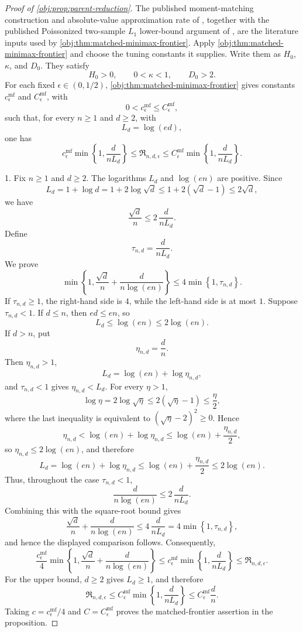 \begin{proof}[Proof of \cref{obj:prop:parent-reduction}]
The published moment-matching construction and absolute-value approximation rate of
\citep[Lemma 1 and Section 3.1]{CaiLow2011L1}, together with the published Poissonized two-sample
\(L_1\) lower-bound argument of \citep[Theorem 3 and equation (24)]{JiaoHanWeissman2018L1},
are the literature inputs used by \cref{obj:thm:matched-minimax-frontier}. Apply
\cref{obj:thm:matched-minimax-frontier} and choose the tuning constants it supplies. Write them as
\(H_0\), \(\kappa\), and \(D_0\). They satisfy
\[
H_0>0,\qquad 0<\kappa<1,\qquad D_0>2 .
\]
For each fixed \(\epsilon\in(0,1/2)\), \cref{obj:thm:matched-minimax-frontier} gives constants
\(c_\epsilon^{\mathrm{mf}}\) and \(C_\epsilon^{\mathrm{mf}}\), with
\[
0<c_\epsilon^{\mathrm{mf}}\le C_\epsilon^{\mathrm{mf}},
\]
such that, for every \(n\ge1\) and \(d\ge2\), with
\[
L_d=\log(ed),
\]
one has
\[
c_\epsilon^{\mathrm{mf}}
\min\left\{1,\frac{d}{nL_d}\right\}
\le
\mathfrak R_{n,d,\epsilon}
\le
C_\epsilon^{\mathrm{mf}}
\min\left\{1,\frac{d}{nL_d}\right\}.
\]

1. Fix \(n\ge1\) and \(d\ge2\). The logarithms \(L_d\) and \(\log(en)\) are positive. Since
\[
L_d
=
1+\log d
=
1+2\log\sqrt d
\le
1+2(\sqrt d-1)
\le
2\sqrt d,
\]
we have
\[
\frac{\sqrt d}{n}
\le
2\,\frac{d}{nL_d}.
\]
Define
\[
\tau_{n,d}=\frac{d}{nL_d}.
\]
We prove
\[
\min\left\{1,\frac{\sqrt d}{n}+\frac{d}{n\log(en)}\right\}
\le
4\min\left\{1,\tau_{n,d}\right\}.
\]
If \(\tau_{n,d}\ge1\), the right-hand side is \(4\), while the left-hand side is at most \(1\).
Suppose \(\tau_{n,d}<1\). If \(d\le n\), then \(ed\le en\), so
\[
L_d\le \log(en)\le 2\log(en).
\]
If \(d>n\), put
\[
\eta_{n,d}=\frac dn .
\]
Then \(\eta_{n,d}>1\),
\[
L_d=\log(en)+\log\eta_{n,d},
\]
and \(\tau_{n,d}<1\) gives \(\eta_{n,d}<L_d\). For every \(\eta>1\),
\[
\log\eta
=
2\log\sqrt\eta
\le
2(\sqrt\eta-1)
\le
\frac{\eta}{2},
\]
where the last inequality is equivalent to \((\sqrt\eta-2)^2\ge0\). Hence
\[
\eta_{n,d}
<
\log(en)+\log\eta_{n,d}
\le
\log(en)+\frac{\eta_{n,d}}2,
\]
so \(\eta_{n,d}\le2\log(en)\), and therefore
\[
L_d
=
\log(en)+\log\eta_{n,d}
\le
\log(en)+\frac{\eta_{n,d}}2
\le
2\log(en).
\]
Thus, throughout the case \(\tau_{n,d}<1\),
\[
\frac{d}{n\log(en)}
\le
2\,\frac{d}{nL_d}.
\]
Combining this with the square-root bound gives
\[
\frac{\sqrt d}{n}+\frac{d}{n\log(en)}
\le
4\,\frac{d}{nL_d}
=
4\min\left\{1,\tau_{n,d}\right\},
\]
and hence the displayed comparison follows. Consequently,
\[
\frac{c_\epsilon^{\mathrm{mf}}}{4}
\min\left\{1,\frac{\sqrt d}{n}+\frac{d}{n\log(en)}\right\}
\le
c_\epsilon^{\mathrm{mf}}
\min\left\{1,\frac{d}{nL_d}\right\}
\le
\mathfrak R_{n,d,\epsilon}.
\]
For the upper bound, \(d\ge2\) gives \(L_d\ge1\), and therefore
\[
\mathfrak R_{n,d,\epsilon}
\le
C_\epsilon^{\mathrm{mf}}
\min\left\{1,\frac{d}{nL_d}\right\}
\le
C_\epsilon^{\mathrm{mf}}\frac dn .
\]
Taking \(c=c_\epsilon^{\mathrm{mf}}/4\) and \(C=C_\epsilon^{\mathrm{mf}}\) proves the matched-frontier assertion in the proposition. %


\end{proof}
